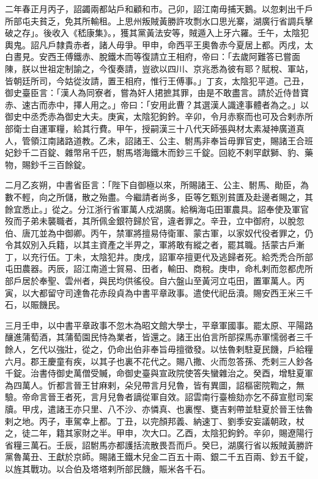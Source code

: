 
\begin{pinyinscope}

 二年春正月丙子，詔蠲兩都站戶和顧和市。己卯，詔江南毋捕天鵝。以忽剌出千戶所部屯夫貧乏，免其所輸租。上思州叛賊黃勝許攻剽水口思光寨，湖廣行省調兵擊破之存」。後收入《嵇康集》。，獲其黨黃法安等，賊遁入上牙六羅。壬午，太陰犯輿鬼。詔凡戶隸貴赤者，諸人毋爭。甲申，命西平王奧魯赤今夏居上都。丙戌，太白晝見。安西王傅鐵赤、脫鐵木而等復請立王相府，帝曰：「去歲阿難答已嘗面陳，朕以世祖定制諭之，今復奏請，豈欲以四川、京兆悉為彼有耶？賦稅、軍站，皆朝廷所司，今姑從汝請，置王相府，惟行王傅事。」丁亥，太陰犯平道。己丑，御史臺臣言：「漢人為同寮者，嘗為奸人捃摭其罪，由是不敢盡言。請於近侍昔寶赤、速古而赤中，擇人用之。」帝曰：「安用此曹？其選漢人識達事體者為之。」以御史中丞禿赤為御史大夫。庚寅，太陰犯鉤鈐。辛卯，令月赤察而也可及合剌赤所部衛士自運軍糧，給其行費。甲午，授嗣漢三十八代天師張與材太素凝神廣道真人，管領江南諸路道教。乙未，詔諸王、公主、駙馬非奉旨毋罪官吏，賜諸王合班妃鈔千二百錠、雜幣帛千匹，駙馬塔海鐵木而鈔三千錠。回紇不剌罕獻獅、豹、藥物，賜鈔千三百餘錠。



 二月乙亥朔，中書省臣言：「陛下自御極以來，所賜諸王、公主、駙馬、勛臣，為數不輕，向之所儲，散之殆盡。今繼請者尚多，臣等乞甄別貧匱及赴邊者賜之，其餘宜悉止。」從之。分江浙行省軍萬人戍湖廣。給稱海屯田軍農具。詔奉使及軍官歿而子弟未襲職者，其所佩金銀符歸於官，違者罪之。辛丑，立中御府，以脫忽伯、唐兀並為中御卿。丙午，禁軍將擅易侍衛軍、蒙古軍，以家奴代役者罪之，仍令其奴別入兵籍，以其主資產之半畀之，軍將敢有縱之者，罷其職。括蒙古戶漸丁，以充行伍。丁未，太陰犯井。庚戌，詔軍卒擅更代及逃歸者死。給禿禿合所部屯田農器。丙辰，詔江南道士貿易、田者，輸田、商稅。庚申，命札剌而忽都虎所部戶居於奉聖、雲州者，與民均供徭役。自六盤山至黃河立屯田，置軍萬人。丙寅，以大都留守司達魯花赤段貞為中書平章政事。遣使代祀岳瀆。賜安西王米三千石，以賑饑民。



 三月壬申，以中書平章政事不忽木為昭文館大學士，平章軍國事。罷太原、平陽路釀進蒲萄酒，其蒲萄園民恃為業者，皆還之。諸王出伯言所部探馬赤軍懦弱者三千餘人，乞代以強壯，從之，仍命出伯非奉旨毋擅徵發。以怯魯剌駐夏民饑，戶給糧六月。郡王慶童有疾，以其子也裏不花代之。賜八撒、火而忽答孫、禿剌三人鈔各千錠。治書侍御史萬僧受贓，命御史臺與宣政院使答失蠻雜治之。癸酉，增駐夏軍為四萬人。忻都言晉王甘麻剌，朵兒帶言月兒魯，皆有異圖，詔樞密院鞫之，無驗。帝命言晉王者死，言月兒魯者謫從軍自效。詔雲南行臺檢劾亦乞不薛宣慰司案牘。甲戌，遣諸王亦只里、八不沙、亦憐真、也裏慳、甕吉剌帶並駐夏於晉王怯魯剌之地。丙子，車駕幸上都。丁丑，以完顏邦義、納速丁、劉季安妄議朝政，杖之，徒二年，籍其家財之半。甲申，次大口。乙酉，太陰犯鉤鈐。辛卯，賜遼陽行省糧三萬石。壬辰，詔駙馬亦都護括流散畏吾而戶。癸巳，湖廣行省以叛賊黃勝許黨魯萬丑、王獻於京師。賜諸王鐵木兒金二百五十兩、銀二千五百兩、鈔五千錠，以旌其戰功。以合伯及塔塔剌所部民饑，賑米各千石。




\end{pinyinscope}
